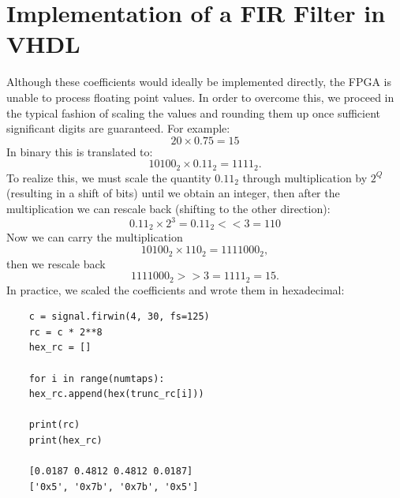 \documentclass[11pt,a4paper,twocolumn]{IEEEtran}
\begin{document}
	\section{Implementation of a FIR Filter in VHDL}
	Although these coefficients would ideally be implemented directly, the FPGA is unable to process floating point values. In order to overcome this, we proceed in the typical fashion of scaling the values and rounding them up once sufficient significant digits are guaranteed.
	For example:\\$$20\times 0.75 = 15$$ In binary this is translated to:
	$$ 10100_2 \times 0.11_2 = 1111_2.$$
	To realize this, we must scale the quantity $0.11_2$ through multiplication by $2^Q$ (resulting in a shift of bits) until we obtain an integer, then after the multiplication we can rescale back (shifting to the other direction):
	$$0.11_2 \times 2^3 = 0.11_2 <<3 = 110$$
	Now we can carry the multiplication
	$$10100_2\times 110_2 = 1111000_2,$$
	then we rescale back
	$$1111000_2 >> 3 = 1111_2 = 15.$$
	In practice, we scaled the coefficients and wrote them in hexadecimal:
	\begin{lstlisting}
	c = signal.firwin(4, 30, fs=125)
	rc = c * 2**8
	hex_rc = []
	
	for i in range(numtaps):
	hex_rc.append(hex(trunc_rc[i]))
	
	print(rc)    
	print(hex_rc)
	
	[0.0187 0.4812 0.4812 0.0187]
	['0x5', '0x7b', '0x7b', '0x5']
	\end{lstlisting}
\end{document}
